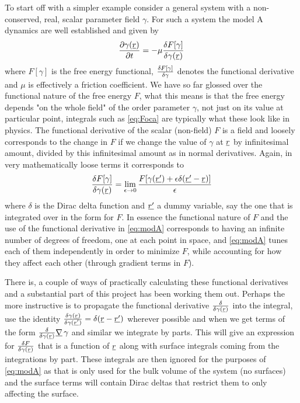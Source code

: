 \documentclass[12pt]{article}
\newcommand{\suf}[2]{\stackunder[0.5pt]{\stackunder[1pt]{\ensuremath{#1}}{\rule{\widthof{\ensuremath{#2}}*\real{0.9}}{.1ex}}}{}}
\newcommand{\su}[1]{\suf{#1}{#1}}
\newcommand{\ssu}[1]{\scriptsize\su{#1}\normalsize}
\newcommand{\mgrad}{\ensuremath{\suf{\nabla}{K}\,}}
\begin{document}
        To start off with a simpler example consider a general system with a non-conserved, real, scalar parameter field $\gamma$.
        For such a system the model A dynamics are well established and given by
        \begin{equation}\label{eq:modA}
            \pdv{\gamma(\su{r})}{t} = -\mu \fdv{F[\gamma]}{\gamma(\su{r})}
        \end{equation}
        where $F[\gamma]$ is the free energy functional, $\fdv{F[\gamma]}{\gamma}$ denotes the functional derivative and $\mu$ is effectively a friction coefficient\cite{kardarStatisticalPhysicsFields2007}.
        We have so far glossed over the functional nature of the free energy $F$, what this means is that the free energy depends "on the whole field" of the order parameter $\gamma$, not just on its value at particular point, integrals such as \cref{eq:Foca} are typically what these look like in physics.
        The functional derivative of the scalar (non-field) $F$ is a field and loosely corresponds to the change in $F$ if we change the value of $\gamma$ at $\su{r}$ by infinitesimal amount, divided by this infinitesimal amount as in normal derivatives.
        Again, in very mathematically loose terms it corresponds to
        \begin{equation}
            \fdv{F[\gamma]}{\gamma(\su{r})} = \lim_{\epsilon \rightarrow 0} \frac{F[\gamma(\su{r'}) + \epsilon\delta(\su{r'} - \su{r})]}{\epsilon}
        \end{equation}
        where $\delta$ is the Dirac delta function and $\su{r'}$ a dummy variable, say the one that is integrated over in the form for $F$.
        In essence the functional nature of $F$ and the use of the functional derivative in \cref{eq:modA} corresponds to having an infinite number of degrees of freedom, one at each point in space, and \cref{eq:modA} tunes each of them independently in order to minimize $F$, while accounting for how they affect each other (through gradient terms in $F$).

        There is, a couple of ways of practically calculating these functional derivatives and a substantial part of this project has been working them out.
        Perhaps the more instructive is to propagate the functional derivative $\fdv{\gamma(\ssu{r})}$ into the integral, use the identity $\fdv{\gamma(\ssu{r})}{\gamma(\ssu{r'})} = \delta(\su{r} - \su{r'})$ wherever possible and when we get terms of the form $\fdv{\gamma(\ssu{r})} \mgrad \gamma$ and similar we integrate by parts.
        This will give an expression for $\fdv{F}{\gamma(\ssu{r})}$ that is a function of $\su{r}$ along with surface integrals coming from the integrations by part.
        These integrals are then ignored for the purposes of \cref{eq:modA} as that is only used for the bulk volume of the system (no surfaces) and the surface terms will contain Dirac deltas that restrict them to only affecting the surface.
\end{document}
